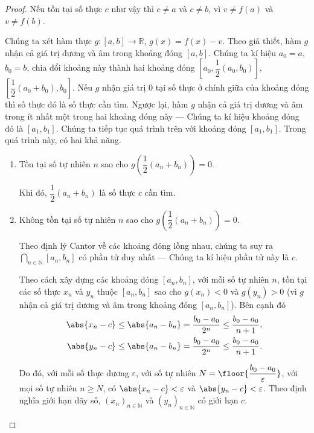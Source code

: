 \begin{proof}
    Nếu tồn tại số thực $c$ như vậy thì $c\ne a$ và $c\ne b$, vì $v\ne f(a)$ và $v\ne f(b)$.

    Chúng ta xét hàm thực $g: [a, b]\to \mathbb{R}$, $g(x) = f(x) - v$. Theo giả thiết, hàm $g$ nhận cả giá trị dương và âm trong khoảng đóng $[a, b]$. Chúng ta kí hiệu $a_{0} = a$, $b_{0} = b$, chia đổi khoảng này thành hai khoảng đóng $\left[a_{0}, \dfrac{1}{2}(a_{0}, b_{0})\right]$, $\left[\dfrac{1}{2}(a_{0} + b_{0}), b_{0}\right]$. Nếu $g$ nhận giá trị $0$ tại số thực ở chính giữa của khoảng đóng thì số thực đó là số thực cần tìm. Ngược lại, hàm $g$ nhận cả giá trị dương và âm trong ít nhất một trong hai khoảng đóng này --- Chúng ta kí hiệu khoảng đóng đó là $[a_{1}, b_{1}]$. Chúng ta tiếp tục quá trình trên với khoảng đóng $[a_{1}, b_{1}]$. Trong quá trình này, có hai khả năng.

    \begin{enumerate}[label={\textbf{Khả năng \arabic*.}},itemindent=1.5cm]
        \item Tồn tại số tự nhiên $n$ sao cho $g\left(\dfrac{1}{2}(a_{n} + b_{n})\right) = 0$.

              Khi đó, $\dfrac{1}{2}(a_{n} + b_{n})$ là số thực $c$ cần tìm.
        \item Không tồn tại số tự nhiên $n$ sao cho $g\left(\dfrac{1}{2}(a_{n} + b_{n})\right) = 0$.

              Theo định lý Cantor về các khoảng đóng lồng nhau, chúng ta suy ra $\bigcap_{n\in\mathbb{N}} [a_{n}, b_{n}]$ có phần tử duy nhất --- Chúng ta kí hiệu phần tử này là $c$.

              Theo cách xây dựng các khoảng đóng $[a_{n}, b_{n}]$, với mỗi số tự nhiên $n$, tồn tại các số thực $x_{n}$ và $y_{n}$ thuộc $[a_{n}, b_{n}]$ sao cho $g(x_{n}) < 0$ và $g(y_{n}) > 0$ (vì $g$ nhận cả giá trị dương và âm trong khoảng đóng $[a_{n}, b_{n}]$). Bên cạnh đó
              \[
                  \begin{split}
                      \abs{x_{n} - c} \leq \abs{a_{n} - b_{n}} = \frac{b_{0} - a_{0}}{2^{n}}\leq \frac{b_{0} - a_{0}}{n+1}, \\
                      \abs{y_{n} - c} \leq \abs{a_{n} - b_{n}} = \frac{b_{0} - a_{0}}{2^{n}}\leq \frac{b_{0} - a_{0}}{n+1}.
                  \end{split}
              \]

              Do đó, với mỗi số thực dương $\varepsilon$, với số tự nhiên $N = \floor{\dfrac{b_{0} - a_{0}}{\varepsilon}}$, với mọi số tự nhiên $n\geq N$, có $\abs{x_{n} - c} < \varepsilon$ và $\abs{y_{n} - c} < \varepsilon$. Theo định nghĩa giới hạn dãy số, ${(x_{n})}_{n\in\mathbb{N}}$ và ${(y_{n})}_{n\in\mathbb{N}}$ có giới hạn $c$.


\end{enumerate}
\end{proof}
